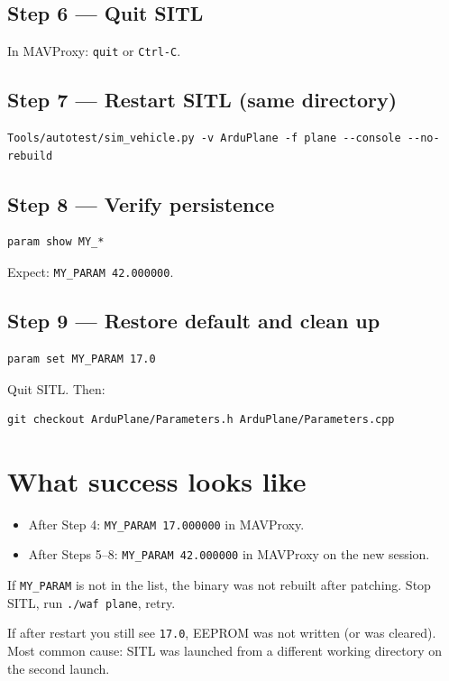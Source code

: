 \documentclass[a4paper,11pt,twoside]{article}
\begin{document}
\subsection*{Step 6 --- Quit SITL}
In MAVProxy: \texttt{quit} or \texttt{Ctrl-C}.

\subsection*{Step 7 --- Restart SITL (same directory)}
\begin{Verbatim}[frame=single,fontsize=\small]
Tools/autotest/sim_vehicle.py -v ArduPlane -f plane --console --no-rebuild
\end{Verbatim}

\subsection*{Step 8 --- Verify persistence}
\begin{Verbatim}[frame=single,fontsize=\small]
param show MY_*
\end{Verbatim}
Expect: \texttt{MY\_PARAM 42.000000}.

\subsection*{Step 9 --- Restore default and clean up}
\begin{Verbatim}[frame=single,fontsize=\small]
param set MY_PARAM 17.0
\end{Verbatim}
Quit SITL. Then:
\begin{Verbatim}[frame=single,fontsize=\small]
git checkout ArduPlane/Parameters.h ArduPlane/Parameters.cpp
\end{Verbatim}

\section*{What success looks like}
\begin{itemize}
  \item After Step 4: \texttt{MY\_PARAM 17.000000} in MAVProxy.
  \item After Steps 5--8: \texttt{MY\_PARAM 42.000000} in MAVProxy on the new session.
\end{itemize}

If \texttt{MY\_PARAM} is not in the list, the binary was not rebuilt after patching. Stop SITL, run \texttt{./waf plane}, retry.

If after restart you still see \texttt{17.0}, EEPROM was not written (or was cleared). Most common cause: SITL was launched from a different working directory on the second launch.
\end{document}
